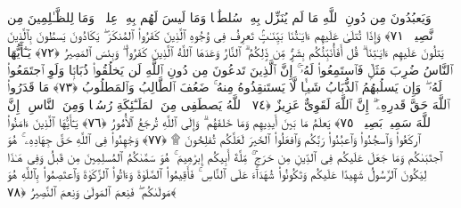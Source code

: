  وَيَعبُدُونَ مِن دُونِ ٱللَّهِ مَا لَم يُنَزِّل بِهِۦ سُلطَٰنًۭا وَمَا لَيسَ لَهُم بِهِۦ عِلمٌۭ ۗ وَمَا لِلظَّـٰلِمِينَ مِن نَّصِيرٍۢ ﴿٧١﴾
 وَإِذَا تُتلَىٰ عَلَيهِم ءَايَـٰتُنَا بَيِّنَـٰتٍۢ تَعرِفُ فِى وُجُوهِ ٱلَّذِينَ كَفَرُوا۟ ٱلمُنكَرَ ۖ يَكَادُونَ يَسطُونَ بِٱلَّذِينَ يَتلُونَ عَلَيهِم ءَايَـٰتِنَا ۗ قُل أَفَأُنَبِّئُكُم بِشَرٍّۢ مِّن ذَٟلِكُمُ ۗ ٱلنَّارُ وَعَدَهَا ٱللَّهُ ٱلَّذِينَ كَفَرُوا۟ ۖ وَبِئسَ ٱلمَصِيرُ ﴿٧٢﴾
 يَـٰٓأَيُّهَا ٱلنَّاسُ ضُرِبَ مَثَلٌۭ فَٱستَمِعُوا۟ لَهُۥٓ ۚ إِنَّ ٱلَّذِينَ تَدعُونَ مِن دُونِ ٱللَّهِ لَن يَخلُقُوا۟ ذُبَابًۭا وَلَوِ ٱجتَمَعُوا۟ لَهُۥ ۖ وَإِن يَسلُبهُمُ ٱلذُّبَابُ شَيـًۭٔا لَّا يَستَنقِذُوهُ مِنهُ ۚ ضَعُفَ ٱلطَّالِبُ وَٱلمَطلُوبُ ﴿٧٣﴾
 مَا قَدَرُوا۟ ٱللَّهَ حَقَّ قَدرِهِۦٓ ۗ إِنَّ ٱللَّهَ لَقَوِىٌّ عَزِيزٌ ﴿٧٤﴾
 ٱللَّهُ يَصطَفِى مِنَ ٱلمَلَـٰٓئِكَةِ رُسُلًۭا وَمِنَ ٱلنَّاسِ ۚ إِنَّ ٱللَّهَ سَمِيعٌۢ بَصِيرٌۭ ﴿٧٥﴾
 يَعلَمُ مَا بَينَ أَيدِيهِم وَمَا خَلفَهُم ۗ وَإِلَى ٱللَّهِ تُرجَعُ ٱلأُمُورُ ﴿٧٦﴾
 يَـٰٓأَيُّهَا ٱلَّذِينَ ءَامَنُوا۟ ٱركَعُوا۟ وَٱسجُدُوا۟ وَٱعبُدُوا۟ رَبَّكُم وَٱفعَلُوا۟ ٱلخَيرَ لَعَلَّكُم تُفلِحُونَ ۩ ﴿٧٧﴾
 وَجَٰهِدُوا۟ فِى ٱللَّهِ حَقَّ جِهَادِهِۦ ۚ هُوَ ٱجتَبَىٰكُم وَمَا جَعَلَ عَلَيكُم فِى ٱلدِّينِ مِن حَرَجٍۢ ۚ مِّلَّةَ أَبِيكُم إِبرَٰهِيمَ ۚ هُوَ سَمَّىٰكُمُ ٱلمُسلِمِينَ مِن قَبلُ وَفِى هَـٰذَا لِيَكُونَ ٱلرَّسُولُ شَهِيدًا عَلَيكُم وَتَكُونُوا۟ شُهَدَآءَ عَلَى ٱلنَّاسِ ۚ فَأَقِيمُوا۟ ٱلصَّلَوٰةَ وَءَاتُوا۟ ٱلزَّكَوٰةَ وَٱعتَصِمُوا۟ بِٱللَّهِ هُوَ مَولَىٰكُم ۖ فَنِعمَ ٱلمَولَىٰ وَنِعمَ ٱلنَّصِيرُ ﴿٧٨﴾
 
